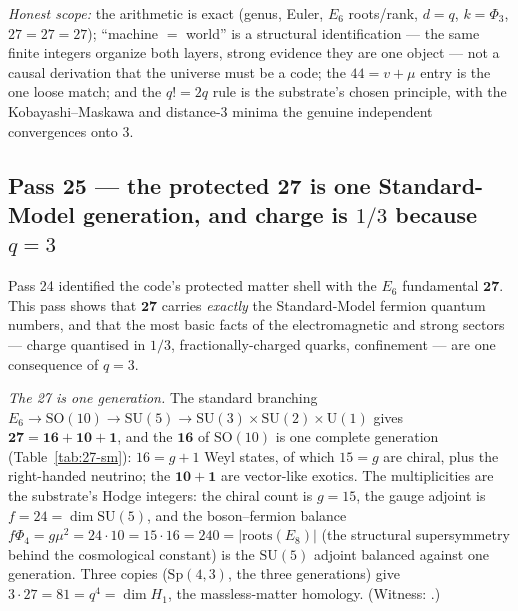 \documentclass[11pt]{article}
\begin{document}
\emph{Honest scope:} the arithmetic is exact (genus, Euler, $E_6$ roots/rank, $d=q$, $k=\Phi_3$,
$27=27=27$); ``machine $=$ world'' is a structural identification --- the same finite integers
organize both layers, strong evidence they are one object --- not a causal derivation that the
universe must be a code; the $44=v+\mu$ entry is the one loose match; and the $q!=2q$ rule is the
substrate's chosen principle, with the Kobayashi--Maskawa and distance-$3$ minima the genuine
independent convergences onto $3$.

\subsection{Pass 25 --- the protected 27 is one Standard-Model generation, and charge is $1/3$ because $q=3$}
\label{sec:capstone-twentyfive}

Pass 24 identified the code's protected matter shell with the $E_6$ fundamental $\mathbf{27}$. This
pass shows that $\mathbf{27}$ carries \emph{exactly} the Standard-Model fermion quantum numbers, and
that the most basic facts of the electromagnetic and strong sectors --- charge quantised in $1/3$,
fractionally-charged quarks, confinement --- are one consequence of $q=3$.

\emph{The 27 is one generation.} The standard branching $E_6\to\mathrm{SO}(10)\to\mathrm{SU}(5)\to
\mathrm{SU}(3){\times}\mathrm{SU}(2){\times}\mathrm{U}(1)$ gives $\mathbf{27}=\mathbf{16}+\mathbf{10}
+\mathbf{1}$, and the $\mathbf{16}$ of $\mathrm{SO}(10)$ is one complete generation
(Table~\ref{tab:27-sm}): $16=g+1$ Weyl states, of which $15=g$ are chiral, plus the right-handed
neutrino; the $\mathbf{10}+\mathbf{1}$ are vector-like exotics. The multiplicities are the
substrate's Hodge integers: the chiral count is $g=15$, the gauge adjoint is $f=24=\dim\mathrm{SU}(5)$,
and the boson--fermion balance $f\Phi_4=g\mu^2=24\cdot10=15\cdot16=240=|\mathrm{roots}(E_8)|$ (the
structural supersymmetry behind the cosmological constant) is the $\mathrm{SU}(5)$ adjoint balanced
against one generation. Three copies ($\mathrm{Sp}(4,3)$, the three generations) give $3\cdot27=81=
q^4=\dim H_1$, the massless-matter homology. (Witness:
.)
\end{document}
